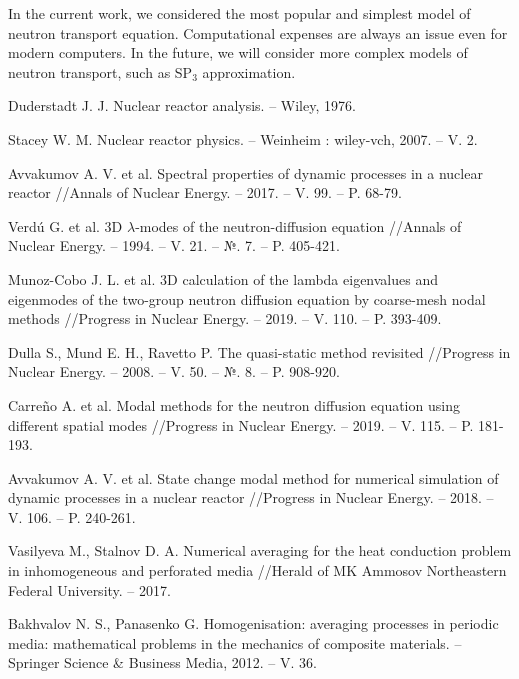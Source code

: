 \documentclass[10pt]{article}
\begin{document}
In the current work, we considered the most popular and simplest model of neutron transport equation.
Computational expenses are always an issue even for modern computers.
In the future, we will consider more complex models of neutron transport, such as SP$_3$ approximation.


\begin{thebibliography}{8}
Duderstadt J. J. Nuclear reactor analysis. – Wiley, 1976.

Stacey W. M. Nuclear reactor physics. – Weinheim : wiley-vch, 2007. – V. 2.

Avvakumov A. V. et al. Spectral properties of dynamic processes in a nuclear reactor //Annals of Nuclear Energy. – 2017. – V. 99. – P. 68-79.

Verdú G. et al. 3D $\lambda$-modes of the neutron-diffusion equation //Annals of Nuclear Energy. – 1994. – V. 21. – №. 7. – P. 405-421.

Munoz-Cobo J. L. et al. 3D calculation of the lambda eigenvalues and eigenmodes of the two-group neutron diffusion equation by coarse-mesh nodal methods //Progress in Nuclear Energy. – 2019. – V. 110. – P. 393-409.

Dulla S., Mund E. H., Ravetto P. The quasi-static method revisited //Progress in Nuclear Energy. – 2008. – V. 50. – №. 8. – P. 908-920.

Carreño A. et al. Modal methods for the neutron diffusion equation using different spatial modes //Progress in Nuclear Energy. – 2019. – V. 115. – P. 181-193.

Avvakumov A. V. et al. State change modal method for numerical simulation of dynamic processes in a nuclear reactor //Progress in Nuclear Energy. – 2018. – V. 106. – P. 240-261.

Vasilyeva M., Stalnov D. A. Numerical averaging for the heat conduction problem in inhomogeneous and perforated media //Herald of MK Ammosov Northeastern Federal University. – 2017.

Bakhvalov N. S., Panasenko G. Homogenisation: averaging processes in periodic media: mathematical problems in the mechanics of composite materials. – Springer Science \& Business Media, 2012. – V. 36.


\end{thebibliography}
\end{document}
